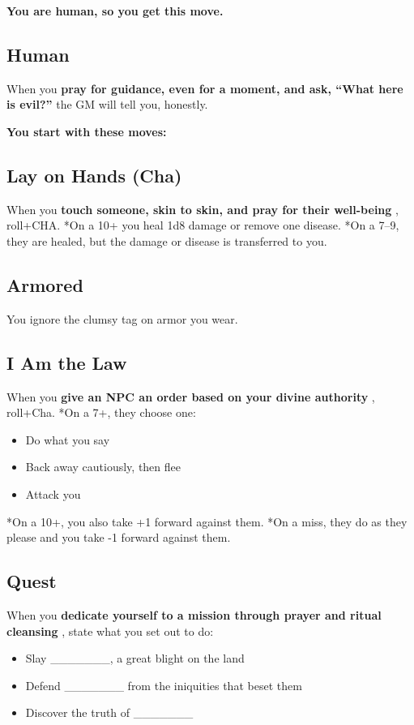 {\bfseries You are human, so you get this move.}
\subsection{Human}


 When you \textbf{pray for guidance, even for a moment, and ask, ``What here is evil?''}
 the GM will tell you, honestly.


\vspace{\baselineskip}
{\bfseries You start with these moves:}
\subsection{Lay on Hands (Cha)}


 When you \textbf{touch someone, skin to skin, and pray for their well-being }
, roll+CHA. *On a 10+ you heal 1d8 damage or remove one disease. *On a 7--9, they are healed, but the damage or disease is transferred to you.
\subsection{Armored}


 You ignore the clumsy tag on armor you wear.
\subsection{I Am the Law}


 When you \textbf{give an NPC an order based on your divine authority}
, roll+Cha. *On a 7+, they choose one:
\begin{itemize}
\item Do what you say
\item Back away cautiously, then flee
\item Attack you

\end{itemize}


 *On a 10+, you also take +1 forward against them. *On a miss, they do as they please and you take -1 forward against them.
\subsection{Quest}


 When you \textbf{dedicate yourself to a mission through prayer and ritual cleansing}
, state what you set out to do:
\begin{itemize}
\item Slay \_\_\_\_\_\_\_, a great blight on the land
\item Defend \_\_\_\_\_\_\_ from the iniquities that beset them
\item Discover the truth of \_\_\_\_\_\_\_

\end{itemize}


